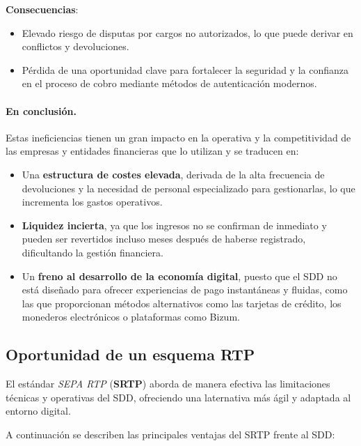 \begin{enumerate}[label=\textbf{\arabic*.}, leftmargin=0.75cm]
        \textbf{Consecuencias}:
        \begin{itemize}
          \item Elevado riesgo de disputas por cargos no autorizados, lo que puede derivar en conflictos y devoluciones.
          \item Pérdida de una oportunidad clave para fortalecer la seguridad y la confianza en el proceso de cobro mediante métodos de autenticación modernos.
        \end{itemize}
\end{enumerate}

\paragraph{En conclusión.} Estas ineficiencias tienen un gran impacto en la operativa y la competitividad de las empresas y entidades financieras que lo utilizan y se traducen en:

\begin{itemize}[leftmargin=0.45cm]
  \item Una \textbf{estructura de costes elevada}, derivada de la alta frecuencia de devoluciones y la necesidad de personal especializado para gestionarlas, lo que incrementa los gastos operativos.
  \item \textbf{Liquidez incierta}, ya que los ingresos no se confirman de inmediato y pueden ser revertidos incluso meses después de haberse registrado, dificultando la gestión financiera.
  \item Un \textbf{freno al desarrollo de la economía digital}, puesto que el SDD no está diseñado para ofrecer experiencias de pago instantáneas y fluidas, como las que proporcionan métodos alternativos como las tarjetas de crédito, los monederos electrónicos o plataformas como Bizum.
\end{itemize}

\subsection{Oportunidad de un esquema RTP}
\label{subsec:oportunidadRTP}
El estándar \textit{SEPA RTP} (\textbf{SRTP}) aborda de manera efectiva las limitaciones técnicas y operativas del SDD, ofreciendo una laternativa más ágil y adaptada al entorno digital.

A continuación se describen las principales ventajas del SRTP frente al SDD:

